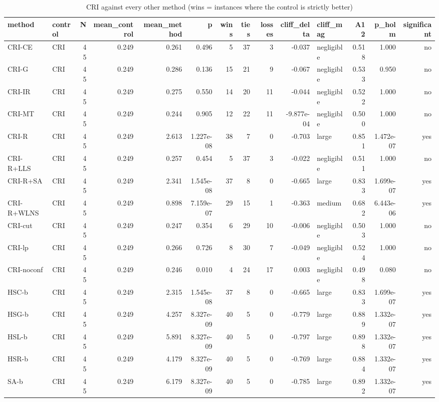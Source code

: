 \begin{table}[htbp]
\centering
\small
\caption{CRI against every other method (wins = instances where the control is strictly better)}
\label{tab:E5_ablation_b10_vs_CRI}
\begin{tabular}{llrrrrrrrrlrrr}
\toprule
method & control & N & mean\_control & mean\_method & p & wins & ties & losses & cliff\_delta & cliff\_mag & A12 & p\_holm & significant \\
\midrule
CRI-CE & CRI & 45 & 0.249 & 0.261 & 0.496 & 5 & 37 & 3 & -0.037 & negligible & 0.518 & 1.000 & no \\
CRI-G & CRI & 45 & 0.249 & 0.286 & 0.136 & 15 & 21 & 9 & -0.067 & negligible & 0.533 & 0.950 & no \\
CRI-IR & CRI & 45 & 0.249 & 0.275 & 0.550 & 14 & 20 & 11 & -0.044 & negligible & 0.522 & 1.000 & no \\
CRI-MT & CRI & 45 & 0.249 & 0.244 & 0.905 & 12 & 22 & 11 & -9.877e-04 & negligible & 0.500 & 1.000 & no \\
CRI-R & CRI & 45 & 0.249 & 2.613 & 1.227e-08 & 38 & 7 & 0 & -0.703 & large & 0.851 & 1.472e-07 & yes \\
CRI-R+LLS & CRI & 45 & 0.249 & 0.257 & 0.454 & 5 & 37 & 3 & -0.022 & negligible & 0.511 & 1.000 & no \\
CRI-R+SA & CRI & 45 & 0.249 & 2.341 & 1.545e-08 & 37 & 8 & 0 & -0.665 & large & 0.833 & 1.699e-07 & yes \\
CRI-R+WLNS & CRI & 45 & 0.249 & 0.898 & 7.159e-07 & 29 & 15 & 1 & -0.363 & medium & 0.682 & 6.443e-06 & yes \\
CRI-cut & CRI & 45 & 0.249 & 0.247 & 0.354 & 6 & 29 & 10 & -0.006 & negligible & 0.503 & 1.000 & no \\
CRI-lp & CRI & 45 & 0.249 & 0.266 & 0.726 & 8 & 30 & 7 & -0.049 & negligible & 0.524 & 1.000 & no \\
CRI-noconf & CRI & 45 & 0.249 & 0.246 & 0.010 & 4 & 24 & 17 & 0.003 & negligible & 0.498 & 0.080 & no \\
HSC-b & CRI & 45 & 0.249 & 2.315 & 1.545e-08 & 37 & 8 & 0 & -0.665 & large & 0.833 & 1.699e-07 & yes \\
HSG-b & CRI & 45 & 0.249 & 4.257 & 8.327e-09 & 40 & 5 & 0 & -0.779 & large & 0.889 & 1.332e-07 & yes \\
HSL-b & CRI & 45 & 0.249 & 5.891 & 8.327e-09 & 40 & 5 & 0 & -0.797 & large & 0.898 & 1.332e-07 & yes \\
HSR-b & CRI & 45 & 0.249 & 4.179 & 8.327e-09 & 40 & 5 & 0 & -0.769 & large & 0.884 & 1.332e-07 & yes \\
SA-b & CRI & 45 & 0.249 & 6.179 & 8.327e-09 & 40 & 5 & 0 & -0.785 & large & 0.892 & 1.332e-07 & yes \\
\bottomrule
\end{tabular}
\end{table}

